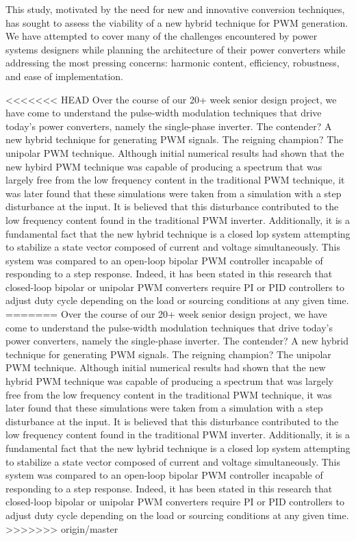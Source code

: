 This study, motivated by the need for new and innovative conversion techniques, has sought to assess the viability of a new hybrid technique for PWM generation. We have attempted to cover many of the challenges encountered by power systems designers while planning the architecture of their power converters while addressing the most pressing concerns: harmonic content, efficiency, robustness, and ease of implementation.

<<<<<<< HEAD
Over the course of our 20+ week senior design project, we have come to understand the pulse-width modulation techniques that drive today's power converters, namely the single-phase inverter. The contender? A new hybrid technique for generating PWM signals. The reigning champion? The unipolar PWM technique. Although initial numerical results had shown that the new hybird PWM technique was capable of producing a spectrum that was largely free from the low frequency content in the traditional PWM technique, it was later found that these simulations were taken from a simulation with a step disturbance at the input. It is believed that this disturbance contributed to the low frequency content found in the traditional PWM inverter. Additionally, it is a fundamental fact that the new hybrid technique is a closed lop system attempting to stabilize a state vector composed of current and voltage simultaneously. This system was compared to an open-loop bipolar PWM controller incapable of responding to a step response. Indeed, it has been stated in this research that closed-loop bipolar or unipolar PWM converters require PI or PID controllers to adjust duty cycle depending on the load or sourcing conditions at any given time. 
=======
Over the course of our 20+ week senior design project, we have come to understand the pulse-width modulation techniques that drive today's power converters, namely the single-phase inverter. The contender? A new hybrid technique for generating PWM signals. The reigning champion? The unipolar PWM technique. Although initial numerical results had shown that the new hybrid PWM technique was capable of producing a spectrum that was largely free from the low frequency content in the traditional PWM technique, it was later found that these simulations were taken from a simulation with a step disturbance at the input. It is believed that this disturbance contributed to the low frequency content found in the traditional PWM inverter. Additionally, it is a fundamental fact that the new hybrid technique is a closed lop system attempting to stabilize a state vector composed of current and voltage simultaneously. This system was compared to an open-loop bipolar PWM controller incapable of responding to a step response. Indeed, it has been stated in this research that closed-loop bipolar or unipolar PWM converters require PI or PID controllers to adjust duty cycle depending on the load or sourcing conditions at any given time. 
>>>>>>> origin/master
 


